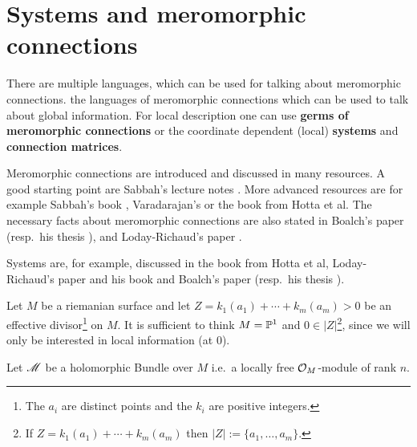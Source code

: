 \chapter{Systems and meromorphic connections}
There are multiple languages, which can be used for talking about meromorphic
connections.
 the languages of meromorphic connections which can be used to
talk about global information.
For local description one can use \textbf{germs of meromorphic connections} or
the coordinate dependent (local) \textbf{systems} and \textbf{connection
matrices}. 

Meromorphic connections are introduced and discussed in many resources.
A good starting point are Sabbah's lecture notes \cite{sabbah_cimpa90}.
More advanced resources are for example
Sabbah's book \cite{sabbah2007isomonodromic},
Varadarajan's \cite{Varadarajan96linearmeromorphic} or
the book \cite{hotta2008} from Hotta et al.
The necessary facts about meromorphic connections are also stated in
Boalch's paper \cite{boalch} (resp.\ his thesis \cite{thboalch}),
and Loday-Richaud's paper \cite{Loday1994}.

Systems are, for example, discussed in 
the book \cite{hotta2008} from Hotta et al,
Loday-Richaud's paper \cite{Loday1994} and his book \cite{Loday2014} and
Boalch's paper \cite{boalch} (resp.\ his thesis \cite{thboalch}).

Let $M$ be a riemanian surface and let $Z=k_1(a_1)+\cdots+k_m(a_m)>0$ be an
effective divisor\footnote{The $a_i$ are distinct points and the $k_i$ are
positive integers.} on $M$.
It is sufficient to think $M=\P^1$ and $0\in|Z|$\footnote{If
$Z=k_1(a_1)+\cdots+k_m(a_m)$ then $|Z|:=\{a_1,\dots,a_m\}$.}, since we will
only be interested in local information (at $0$).

Let $\sM$ be a holomorphic Bundle over $M$ i.e.\ a locally free $\cO_M$-module
of rank $n$.

